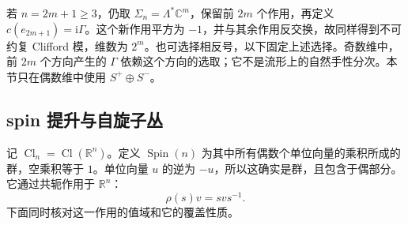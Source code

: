 若 \(n=2m+1\ge3\)，仍取 \(\Sigma_n=\Lambda^*\mathbb C^m\)，保留前 \(2m\) 个作用，再定义 \(c(e_{2m+1})=\mathrm i\Gamma\)。这个新作用平方为 \(-1\)，并与其余作用反交换，故同样得到不可约复 Clifford 模，维数为 \(2^m\)。也可选择相反号，以下固定上述选择。奇数维中，前 \(2m\) 个方向产生的 \(\Gamma\) 依赖这个方向的选取；它不是流形上的自然手性分次。本节只在偶数维中使用 \(S^+\oplus S^-\)。

\subsection{spin 提升与自旋子丛}
\label{g3:subsec:1703:02}
记 \(\operatorname{Cl}_n=\operatorname{Cl}(\mathbb R^n)\)。定义 \(\operatorname{Spin}(n)\) 为其中所有偶数个单位向量的乘积所成的群，空乘积等于 \(1\)。单位向量 \(u\) 的逆为 \(-u\)，所以这确实是群，且包含于偶部分。它通过共轭作用于 \(\mathbb R^n\)：
\[
	\rho(s)v=svs^{-1}.
\]
下面同时核对这一作用的值域和它的覆盖性质。

